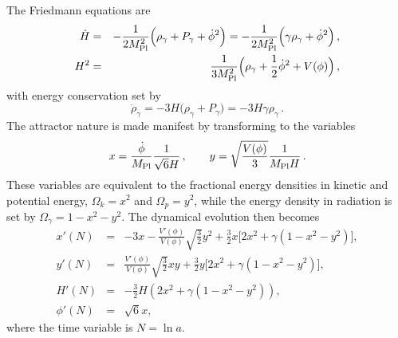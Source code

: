 The Friedmann equations are
\begin{eqnarray}
\dot{H} & = & - \frac{1}{2 M_{\rm Pl}^2}\Big(\rho_{\gamma}+P_{\gamma} + \dot{\phi}^2\Big) = - \frac{1}{2 M_{\rm Pl}^2} \Big( \gamma \rho_{\gamma}+ \dot{\phi}^2\Big)\,, \\
H^2 & = & \frac{1}{3 M_{\rm Pl}^2}\Big(\rho_{\gamma}+ \frac12\dot{\phi}^2+ V(\phi) \Big)\,,
\end{eqnarray}
with energy conservation set by
\begin{equation}
\dot{\rho}_{\gamma}= -3 H \big( \rho_{\gamma}+P_{\gamma} \big) = -3 H \gamma \rho_\gamma\,.
\end{equation}
The attractor nature is made manifest by transforming to the variables
\begin{equation}
x = \frac{\dot{\phi}}{M_{\rm Pl}} \frac{1}{\sqrt{6} H}\,, \quad \quad y = \sqrt{\frac{V(\phi)}{3}} \frac{1}{M_{\rm Pl} H}\,.
\end{equation}
These variables are equivalent to the fractional energy densities in kinetic and potential energy, $\Omega_k = x^2$ and $\Omega_p = y^2$, while the energy density in radiation is set by $\Omega_{\gamma}= 1- x^2 - y^2$.
The dynamical evolution then becomes
\begin{eqnarray}
  x'(N) &=& -3x - \frac{V'(\phi)}{V(\phi)}\sqrt{\frac32} y^2 + \frac32 x \big[ 2x^2 + \gamma(1-x^2-y^2) \big], \nonumber \\
  y'(N) &=& \frac{V'(\phi)}{V(\phi)}\sqrt{\frac32} xy + \frac32 y \big[ 2x^2 + \gamma(1-x^2-y^2) \big], \label{eq:xy2} \\
H'(N) &=& -\frac32 H (2x^2 + \gamma(1-x^2-y^2)), \nonumber \\
\phi'(N) &=& \sqrt{6} x, \nonumber 
\end{eqnarray}
where the time variable is $N = \ln a$.

